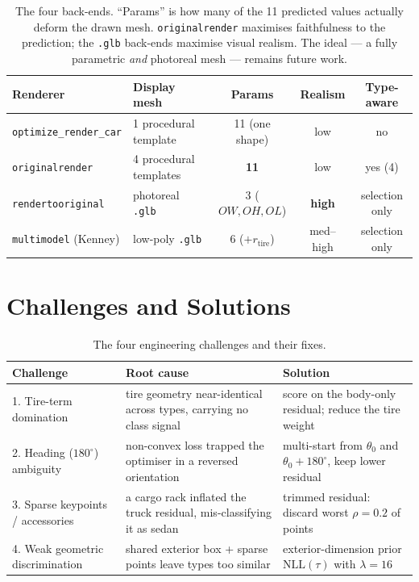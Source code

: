\documentclass[11pt]{article}
\newcommand{\OL}{\mathit{OL}}
\newcommand{\OW}{\mathit{OW}}
\newcommand{\OH}{\mathit{OH}}
\newcommand{\NLL}{\text{NLL}}
\theoremstyle{definition}
\begin{document}
\begin{table}[h]
\centering
\renewcommand{\arraystretch}{1.25}
\begin{tabular}{p{3.4cm} p{3.0cm} c c c}
\toprule
\textbf{Renderer} & \textbf{Display mesh} & \textbf{Params} & \textbf{Realism} & \textbf{Type-aware} \\
\midrule
\texttt{optimize\_render\_car}        & 1 procedural template          & 11 (one shape) & low        & no \\
\texttt{originalrender}               & 4 procedural templates         & \textbf{11}    & low        & yes (4) \\
\texttt{rendertooriginal}             & photoreal \texttt{.glb}        & 3 ($\OW,\OH,\OL$) & \textbf{high} & selection only \\
\texttt{multimodel} (Kenney)          & low-poly \texttt{.glb}         & 6 ($+r_{\text{tire}}$) & med--high & selection only \\
\bottomrule
\end{tabular}
\caption{The four back-ends. ``Params'' is how many of the 11 predicted values
actually deform the drawn mesh. \texttt{originalrender} maximises faithfulness to
the prediction; the \texttt{.glb} back-ends maximise visual realism. The ideal
--- a fully parametric \emph{and} photoreal mesh --- remains future work.}
\end{table}

\section{Challenges and Solutions}

\begin{table}[h]
\centering
\renewcommand{\arraystretch}{1.3}
\begin{tabular}{p{3cm} p{4.5cm} p{4.5cm}}
\toprule
\textbf{Challenge} & \textbf{Root cause} & \textbf{Solution} \\
\midrule
1. Tire-term domination & tire geometry near-identical across types, carrying no class signal & score on the body-only residual; reduce the tire weight \\
2. Heading ($180^\circ$) ambiguity & non-convex loss trapped the optimiser in a reversed orientation & multi-start from $\theta_0$ and $\theta_0+180^\circ$, keep lower residual \\
3. Sparse keypoints / accessories & a cargo rack inflated the truck residual, mis-classifying it as sedan & trimmed residual: discard worst $\rho=0.2$ of points \\
4. Weak geometric discrimination & shared exterior box + sparse points leave types too similar & exterior-dimension prior $\NLL(\tau)$ with $\lambda = 16$ \\
\bottomrule
\end{tabular}
\caption{The four engineering challenges and their fixes.}
\end{table}
\end{document}
